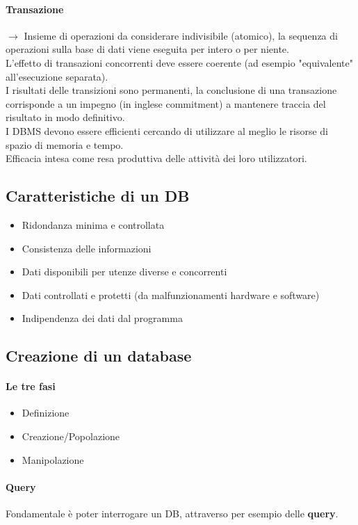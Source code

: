 \paragraph{Transazione} $\to$ Insieme di operazioni da considerare indivisibile (atomico),
la sequenza di operazioni sulla base di dati viene eseguita per intero o per niente.
\\L'effetto di transazioni concorrenti deve essere coerente (ad esempio "equivalente"
all'esecuzione separata).
\\I risultati delle transizioni sono permanenti, la conclusione di una transazione
corrisponde a un impegno (in inglese commitment) a mantenere traccia del risultato in modo
definitivo.
\\ I DBMS devono essere efficienti cercando di utilizzare al meglio le risorse di
spazio di memoria e tempo.
\\ Efficacia intesa come resa produttiva delle attività dei loro utilizzatori.
\subsection*{Caratteristiche di un DB}
\begin{itemize}
    \item Ridondanza minima e controllata
    \item Consistenza delle informazioni
    \item Dati disponibili per utenze diverse e concorrenti
    \item Dati controllati e protetti (da malfunzionamenti hardware e software)
    \item Indipendenza dei dati dal programma
\end{itemize}

\subsection{Creazione di un database}
\paragraph*{Le tre fasi}
\begin{itemize}
    \item Definizione
    \item Creazione/Popolazione
    \item Manipolazione
\end{itemize}

\paragraph*{Query}
Fondamentale è poter interrogare un DB, attraverso per esempio delle \textbf{query}.

